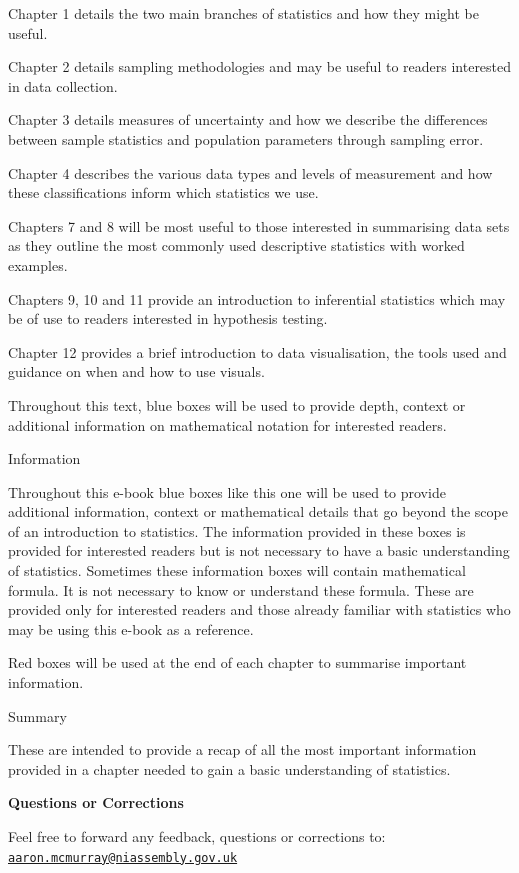 \documentclass[
]{book}
\begin{document}
Chapter 1 details the two main branches of statistics and how they might be useful.

Chapter 2 details sampling methodologies and may be useful to readers interested in data collection.

Chapter 3 details measures of uncertainty and how we describe the differences between sample statistics and population parameters through sampling error.

Chapter 4 describes the various data types and levels of measurement and how these classifications inform which statistics we use.

Chapters 7 and 8 will be most useful to those interested in summarising data sets as they outline the most commonly used descriptive statistics with worked examples.

Chapters 9, 10 and 11 provide an introduction to inferential statistics which may be of use to readers interested in hypothesis testing.

Chapter 12 provides a brief introduction to data visualisation, the tools used and guidance on when and how to use visuals.

Throughout this text, blue boxes will be used to provide depth, context or additional information on mathematical notation for interested readers.

Information

Throughout this e-book blue boxes like this one will be used to provide additional information, context or mathematical details that go beyond the scope of an introduction to statistics. The information provided in these boxes is provided for interested readers but is not necessary to have a basic understanding of statistics. Sometimes these information boxes will contain mathematical formula. It is not necessary to know or understand these formula. These are provided only for interested readers and those already familiar with statistics who may be using this e-book as a reference.

Red boxes will be used at the end of each chapter to summarise important information.

Summary

These are intended to provide a recap of all the most important information provided in a chapter needed to gain a basic understanding of statistics.

\textbf{Questions or Corrections}

Feel free to forward any feedback, questions or corrections to: \href{mailto:aaron.mcmurray@niassembly.gov.uk}{\nolinkurl{aaron.mcmurray@niassembly.gov.uk}}
\end{document}
